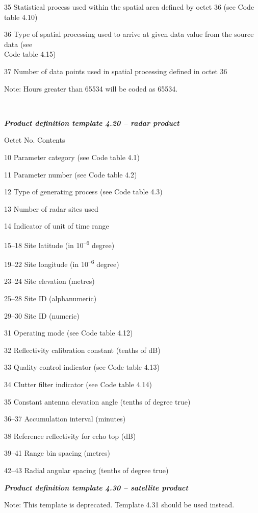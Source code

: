 35 Statistical process used within the spatial area defined by octet 36 (see Code table 4.10)

36 Type of spatial processing used to arrive at given data value from the source data (see\\
Code table 4.15)

37 Number of data points used in spatial processing defined in octet 36

Note: Hours greater than 65534 will be coded as 65534.

\emph{\textbf{\\
}}

\emph{\textbf{Product definition template 4.20 -- radar product}}

Octet No. Contents

10 Parameter category (see Code table 4.1)

11 Parameter number (see Code table 4.2)

12 Type of generating process (see Code table 4.3)

13 Number of radar sites used

14 Indicator of unit of time range

15--18 Site latitude (in 10\textsuperscript{--6} degree)

19--22 Site longitude (in 10\textsuperscript{--6} degree)

23--24 Site elevation (metres)

25--28 Site ID (alphanumeric)

29--30 Site ID (numeric)

31 Operating mode (see Code table 4.12)

32 Reflectivity calibration constant (tenths of dB)

33 Quality control indicator (see Code table 4.13)

34 Clutter filter indicator (see Code table 4.14)

35 Constant antenna elevation angle (tenths of degree true)

36--37 Accumulation interval (minutes)

38 Reference reflectivity for echo top (dB)

39--41 Range bin spacing (metres)

42--43 Radial angular spacing (tenths of degree true)

\emph{\textbf{Product definition template 4.30 -- satellite product}}

Note: This template is deprecated. Template 4.31 should be used instead.

